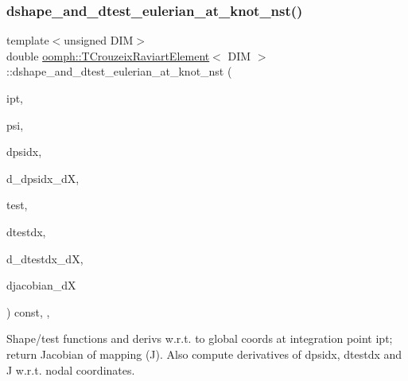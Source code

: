 \mbox{\label{classoomph_1_1TCrouzeixRaviartElement_a8f0a0b0ce73561795fdd55c04f8bdc98}} 
\subsubsection{\texorpdfstring{dshape\+\_\+and\+\_\+dtest\+\_\+eulerian\+\_\+at\+\_\+knot\+\_\+nst()}{dshape\_and\_dtest\_eulerian\_at\_knot\_nst()}\hspace{0.1cm}{\footnotesize\ttfamily [2/2]}}
{\footnotesize\ttfamily template$<$unsigned D\+IM$>$ \\
double \hyperlink{classoomph_1_1TCrouzeixRaviartElement}{oomph\+::\+T\+Crouzeix\+Raviart\+Element}$<$ D\+IM $>$\+::dshape\+\_\+and\+\_\+dtest\+\_\+eulerian\+\_\+at\+\_\+knot\+\_\+nst (\begin{DoxyParamCaption}\item[{const unsigned \&}]{ipt,  }\item[{\hyperlink{classoomph_1_1Shape}{Shape} \&}]{psi,  }\item[{\hyperlink{classoomph_1_1DShape}{D\+Shape} \&}]{dpsidx,  }\item[{\hyperlink{classoomph_1_1RankFourTensor}{Rank\+Four\+Tensor}$<$ double $>$ \&}]{d\+\_\+dpsidx\+\_\+dX,  }\item[{\hyperlink{classoomph_1_1Shape}{Shape} \&}]{test,  }\item[{\hyperlink{classoomph_1_1DShape}{D\+Shape} \&}]{dtestdx,  }\item[{\hyperlink{classoomph_1_1RankFourTensor}{Rank\+Four\+Tensor}$<$ double $>$ \&}]{d\+\_\+dtestdx\+\_\+dX,  }\item[{\hyperlink{classoomph_1_1DenseMatrix}{Dense\+Matrix}$<$ double $>$ \&}]{djacobian\+\_\+dX }\end{DoxyParamCaption}) const\hspace{0.3cm}{\ttfamily [inline]}, {\ttfamily [protected]}, {\ttfamily [virtual]}}



Shape/test functions and derivs w.\+r.\+t. to global coords at integration point ipt; return Jacobian of mapping (J). Also compute derivatives of dpsidx, dtestdx and J w.\+r.\+t. nodal coordinates. 

